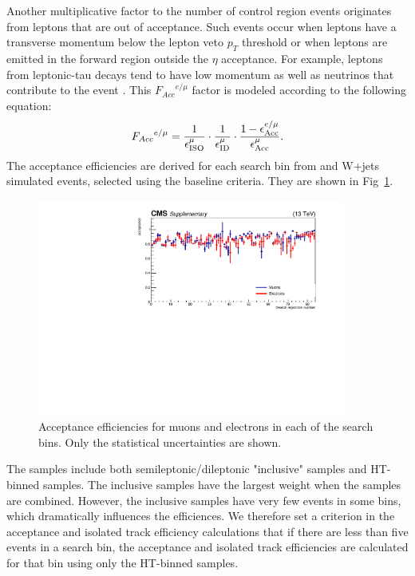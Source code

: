 Another multiplicative factor to the number of control region events originates from leptons that 
are out of acceptance. Such events occur when leptons have a transverse 
momentum below the lepton veto $p_{T}$ threshold or when leptons are emitted in 
the forward region outside the $\eta$ acceptance. %
For example, leptons from leptonic-tau decays tend to have low 
momentum as well as neutrinos that contribute to the event \MET. 
This ${F_{Acc}}^{e/\mu}$ factor is modeled according to the following equation:
\begin{equation}
{F_{Acc}}^{e/\mu} = \frac{1}{\epsilon_{\rm ISO}^{\mu}}\cdot \frac{1}{\epsilon_{\rm ID}^{\mu}}  \cdot \frac{1 - \epsilon^{e/\mu}_{\rm Acc}}{\epsilon^{\mu}_{\rm Acc}}.
\label{eq:accept}
\end{equation}
The acceptance efficiencies are derived for each search bin 
from \ttbar and W$+$jets simulated events,
selected using the baseline criteria. 
They are shown in Fig~\ref{fig:acceptance}.

\begin{figure}[hptb]
\begin{center}
\includegraphics[width=0.9\textwidth]{sections/mc4/Backgrounds/LostLepton/figures/v2_acc_eff_84bins.pdf}%
\end{center}
\caption{Acceptance efficiencies for muons and electrons in each of the
search bins. Only the statistical uncertainties are shown.}
\label{fig:acceptance}
\end{figure}

The \ttbar samples include both semileptonic/dileptonic "inclusive" samples and HT-binned samples.
The \ttbar inclusive samples have the largest weight when the samples are combined.
However, the \ttbar inclusive samples have very few events in some bins, which dramatically influences the efficiences.
We therefore set a criterion in the acceptance and isolated track efficiency calculations that if there are less than five events in a search bin, the acceptance and isolated track efficiencies are calculated for that bin using only the HT-binned samples.

